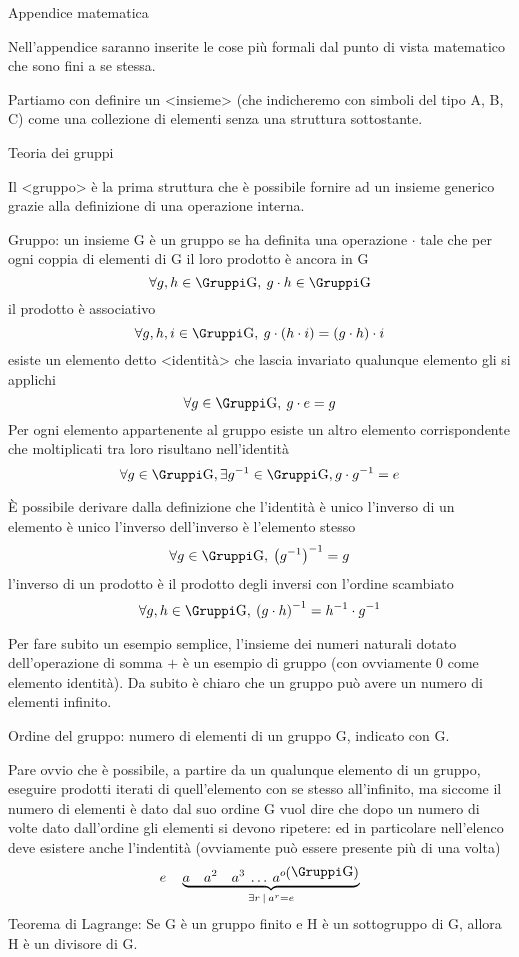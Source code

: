 \capitolo Appendice matematica

Nell'appendice saranno inserite le cose pi\`u formali dal punto di vista matematico
che sono fini a se stessa.

Partiamo con definire un \evidenzia<insieme> (che indicheremo con simboli del tipo \spazio A, \spazio B, \spazio C)
come una collezione di elementi senza una struttura sottostante.



\sezione Teoria dei gruppi

Il \evidenzia<gruppo> \`e la prima struttura che \`e possibile fornire ad un insieme generico
grazie alla definizione di una operazione interna.

 Gruppo: un insieme \gruppo G \`e un gruppo se ha definita una operazione $\cdot$
tale che
\unorderedlist
\li per ogni coppia di elementi di \gruppo G il loro prodotto \`e ancora in \gruppo G
$$
\forall g,h\in\gruppo G,\>g\cdot h\in \gruppo G
$$
\li il prodotto \`e associativo
$$
\forall g,h,i\in \gruppo G,\> g\cdot\left(h\cdot i\right) = \left(g\cdot h\right)\cdot i
$$
\li esiste un elemento detto \evidenzia<identit\`a> che lascia invariato qualunque elemento gli si applichi
$$
\forall g\in \gruppo G,\>g\cdot e=g
$$
\li Per ogni elemento appartenente al gruppo esiste un altro elemento corrispondente che moltiplicati tra
loro risultano nell'identit\`a
$$
\forall g\in\gruppo G,\exists g^{-1}\in\gruppo G, g\cdot g^{-1} = e
$$
\endunorderedlist

\`E possibile derivare dalla definizione che
\unorderedlist
\li l'identit\`a \`e unico
\li l'inverso di un elemento \`e unico
\li l'inverso dell'inverso \`e l'elemento stesso
$$
\forall g\in\gruppo G,\>\left(g^{-1}\right)^{-1} = g
$$
\li l'inverso di un prodotto \`e il prodotto degli inversi con l'ordine scambiato
$$
\forall g,h\in\gruppo G,\>\left(g\cdot h\right)^{-1} = h^{-1}\cdot g^{-1}
$$
\endunorderedlist

Per fare subito un esempio semplice, l'insieme dei numeri naturali dotato dell'operazione
di somma $+$ \`e un esempio di gruppo (con ovviamente $0$ come elemento identit\`a). Da subito
\`e chiaro che un gruppo pu\`o avere un numero di elementi infinito.

 Ordine del gruppo: numero di elementi di un gruppo \gruppo G, indicato con \ordinegruppo G.

Pare ovvio che \`e possibile, a partire da un qualunque elemento di un gruppo, eseguire prodotti iterati
di quell'elemento con se stesso all'infinito, ma siccome il numero di elementi \`e dato dal suo ordine
\ordinegruppo G vuol dire che dopo un numero di volte dato dall'ordine gli elementi si devono ripetere:
ed in particolare nell'elenco deve esistere anche l'indentit\`a (ovviamente pu\`o essere presente
pi\`u di una volta)
$$
e\quad\underbrace{a\quad a^2\quad a^3\>\dots\> a^{o\left(\gruppo G\right)}}_{\exists r\>|\> a^r=e}
$$
\teorema Teorema di Lagrange: Se \gruppo G \`e un gruppo finito e \gruppo H \`e un sottogruppo
di \gruppo G, allora \ordinegruppo H \`e un divisore di \ordinegruppo G.

